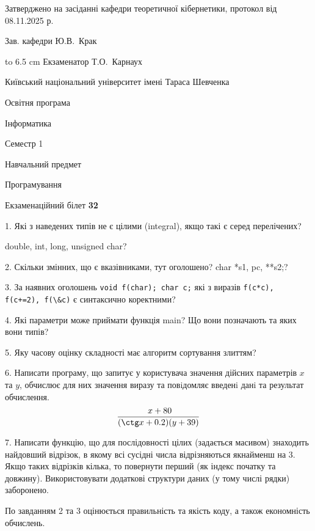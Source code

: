 \documentclass[12pt, ukrainian]{article}
\def\code#1{\Verb!#1!}
\begin{document}
{\smallskip\smallskip \begin {scriptsize} Затверджено на засіданні кафедри теоретичної кібернетики, протокол   від   08.11.2025 р.\par\smallskip\smallskip\smallskip\smallskip
{\parbox {6.5 cm} {Зав. кафедри \dotfill Ю.В.~Крак}}\hspace {0.7cm} {\hbox to 6.5 cm { Екзаменатор \dotfill Т.О.~Карнаух}} \end{scriptsize}}
\vspace{0.9cm}
{{\begin {scriptsize}\par
{ \center  Київський національний університет імені Тараса Шевченка \par}
{\parbox {5 cm}{Освітня програма \hfill}{\parbox {7 cm}{Інформатика\hfill}}\parbox {6 cm}{\hfill Семестр 1}}\par
{\parbox {5 cm} {Навчальний предмет \hfill}\parbox {7 cm}{Програмування \hfill}\parbox {6cm}{\hfill}\par}\vspace{-15pt} \end{scriptsize}}{\center Екзаменаційний білет \No \textbf { 32 }\par}}
{%
1. Які з наведених типів не є цілими (integral), якщо такі є серед перелічених?

double, int, long, unsigned char?
\par
\vspace{2mm}
2. Скільки змінних, що є вказівниками, тут оголошено?
char *s1, pc, **s2;?
\par
\vspace{2mm}
3. За наявних оголошень \code{void f(char); char c;} які з виразів \code{f(c*c), f(c+=2), f(\&c)} є синтаксично коректними?
\par
\vspace{2mm}
4. Які параметри може приймати функція main? Що вони позначають та яких вони типів?
\par
\vspace{2mm}
5. Яку часову оцінку складності має алгоритм сортування злиттям?
\par
\vspace{2mm}
6. Написати програму, що запитує у користувача значення дійсних параметрів $x$ та $y$, обчислює для них значення виразу та повiдомляє введенi данi та результат обчислення.
$$\frac{\ x + 80}{(\ctg x + 0.2) (y + 39)}$$ 

\par
7. Написати функцію, що для послідовності цілих (задається масивом) знаходить найдовший відрізок, в якому всі сусідні числа відрізняються якнайменш на 3. Якщо таких відрізків кілька, то повернути перший (як індекс початку та довжину). Використовувати додаткові структури даних (у тому числі рядки) заборонено.

По завданням 2 та 3 оцінюється правильність та якість коду, а також економність обчислень.

}
\end{document}
